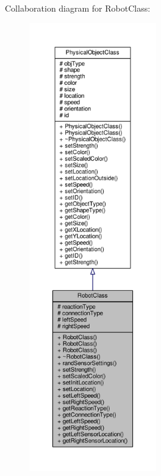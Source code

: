 Collaboration diagram for Robot\-Class\-:
\nopagebreak
\begin{figure}[H]
\begin{center}
\leavevmode
\includegraphics[height=550pt]{classRobotClass__coll__graph}
\end{center}
\end{figure}
